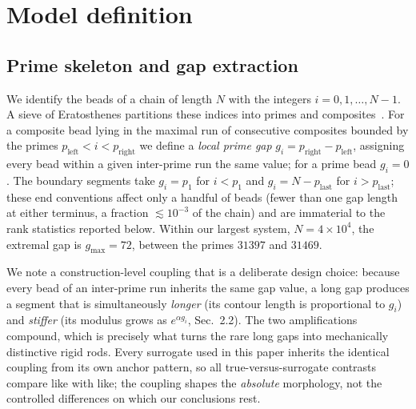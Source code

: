 \documentclass[11pt]{article}
\begin{document}
\section{Model definition}\label{sec:model}

\subsection{Prime skeleton and gap extraction}
We identify the beads of a chain of length $N$ with the integers
$i = 0,1,\dots,N-1$. A sieve of Eratosthenes partitions these indices into primes
and composites~\cite{HardyWright}. For a composite bead lying in the maximal run of
consecutive composites bounded by the primes $p_{\text{left}} < i < p_{\text{right}}$
we define a \emph{local prime gap} $g_i = p_{\text{right}} - p_{\text{left}}$,
assigning every bead within a given inter-prime run the same value; for a prime bead
$g_i = 0$. The boundary segments take $g_i = p_1$ for $i < p_1$ and
$g_i = N - p_{\text{last}}$ for $i > p_{\text{last}}$; these end conventions affect
only a handful of beads (fewer than one gap length at either terminus, a fraction
$\lesssim 10^{-3}$ of the chain) and are immaterial to the rank statistics reported
below. Within our largest system, $N = 4\times10^4$, the extremal gap is
$g_{\max} = 72$, between the primes $31397$ and $31469$.

We note a construction-level coupling that is a deliberate design choice: because
every bead of an inter-prime run inherits the same gap value, a long gap produces a
segment that is simultaneously \emph{longer} (its contour length is proportional to
$g_i$) and \emph{stiffer} (its modulus grows as $e^{\alpha g_i}$, Sec.~2.2). The two
amplifications compound, which is precisely what turns the rare long gaps into
mechanically distinctive rigid rods. Every surrogate used in this paper inherits the
identical coupling from its own anchor pattern, so all true-versus-surrogate
contrasts compare like with like; the coupling shapes the \emph{absolute} morphology,
not the controlled differences on which our conclusions rest.
\end{document}
